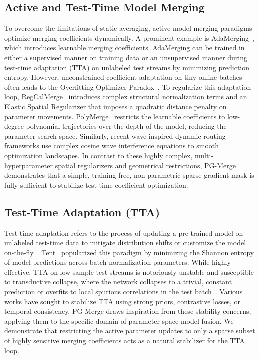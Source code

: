 \subsection{Active and Test-Time Model Merging}
To overcome the limitations of static averaging, active model merging paradigms optimize merging coefficients dynamically. A prominent example is AdaMerging~\cite{adamerging}, which introduces learnable merging coefficients. AdaMerging can be trained in either a supervised manner on training data or an unsupervised manner during test-time adaptation (TTA) on unlabeled test streams by minimizing prediction entropy. However, unconstrained coefficient adaptation on tiny online batches often leads to the Overfitting-Optimizer Paradox~\cite{regcalmerge, polymerge}. To regularize this adaptation loop, RegCalMerge~\cite{regcalmerge} introduces complex structural normalization terms and an Elastic Spatial Regularizer that imposes a quadratic distance penalty on parameter movements. PolyMerge~\cite{polymerge} restricts the learnable coefficients to low-degree polynomial trajectories over the depth of the model, reducing the parameter search space. Similarly, recent wave-inspired dynamic routing frameworks use complex cosine wave interference equations to smooth optimization landscapes. In contrast to these highly complex, multi-hyperparameter spatial regularizers and geometrical restrictions, PG-Merge demonstrates that a simple, training-free, non-parametric sparse gradient mask is fully sufficient to stabilize test-time coefficient optimization.

\subsection{Test-Time Adaptation (TTA)}
Test-time adaptation refers to the process of updating a pre-trained model on unlabeled test-time data to mitigate distribution shifts or customize the model on-the-fly~\cite{wang2020tent, liao2021are}. Tent~\cite{wang2020tent} popularized this paradigm by minimizing the Shannon entropy of model predictions across batch normalization parameters. While highly effective, TTA on low-sample test streams is notoriously unstable and susceptible to transductive collapse, where the network collapses to a trivial, constant prediction or overfits to local spurious correlations in the test batch~\cite{liang2023source, liao2021are}. Various works have sought to stabilize TTA using strong priors, contrastive losses, or temporal consistency. PG-Merge draws inspiration from these stability concerns, applying them to the specific domain of parameter-space model fusion. We demonstrate that restricting the active parameter updates to only a sparse subset of highly sensitive merging coefficients acts as a natural stabilizer for the TTA loop.

